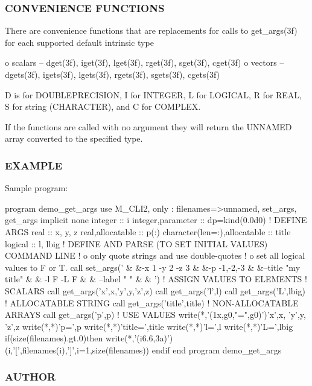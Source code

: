 \subsubsection*{C\+O\+N\+V\+E\+N\+I\+E\+N\+CE F\+U\+N\+C\+T\+I\+O\+NS}

\begin{DoxyVerb}There are convenience functions that are replacements for calls to
get_args(3f) for each supported default intrinsic type

  o scalars -- dget(3f), iget(3f), lget(3f), rget(3f), sget(3f),
               cget(3f)
  o vectors -- dgets(3f), igets(3f), lgets(3f), rgets(3f),
               sgets(3f), cgets(3f)

D is for DOUBLEPRECISION, I for INTEGER, L for LOGICAL, R for REAL,
S for string (CHARACTER), and C for COMPLEX.

If the functions are called with no argument they will return the
UNNAMED array converted to the specified type.
\end{DoxyVerb}


\subsubsection*{E\+X\+A\+M\+P\+LE}

Sample program\+: \begin{DoxyVerb}program demo_get_args
use M_CLI2,  only : filenames=>unnamed, set_args, get_args
implicit none
integer                      :: i
integer,parameter            :: dp=kind(0.0d0)
! DEFINE ARGS
real                         :: x, y, z
real,allocatable             :: p(:)
character(len=:),allocatable :: title
logical                      :: l, lbig
! DEFINE AND PARSE (TO SET INITIAL VALUES) COMMAND LINE
!   o only quote strings and use double-quotes
!   o set all logical values to F or T.
call set_args(' &
   &-x 1 -y 2 -z 3 &
   &-p -1,-2,-3 &
   &--title "my title" &
   & -l F -L F  &
   & --label " " &
   & ')
! ASSIGN VALUES TO ELEMENTS
! SCALARS
call get_args('x',x,'y',y,'z',z)
call get_args('l',l)
call get_args('L',lbig)
! ALLOCATABLE STRING
call get_args('title',title)
! NON-ALLOCATABLE ARRAYS
call get_args('p',p)
! USE VALUES
write(*,'(1x,g0,"=",g0)')'x',x, 'y',y, 'z',z
write(*,*)'p=',p
write(*,*)'title=',title
write(*,*)'l=',l
write(*,*)'L=',lbig
if(size(filenames).gt.0)then
   write(*,'(i6.6,3a)')(i,'[',filenames(i),']',i=1,size(filenames))
endif
end program demo_get_args
\end{DoxyVerb}
 \subsubsection*{A\+U\+T\+H\+OR}

